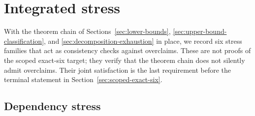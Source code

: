 \section{Integrated stress}\label{sec:integrated-stress}

%
%


With the theorem chain of Sections~\ref{sec:lower-bounds},
\ref{sec:upper-bound-classification}, and
\ref{sec:decomposition-exhaustion} in place, we record six stress
families that act as consistency checks against overclaims. These are
not proofs of the scoped exact-six target; they verify that the
theorem chain does not silently admit overclaims. Their joint
satisfaction is the last requirement before the terminal statement in
Section~\ref{sec:scoped-exact-six}.

\subsection{Dependency stress}\label{subsec:dependency-stress}

